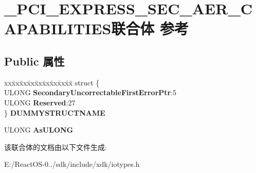 \hypertarget{union___p_c_i___e_x_p_r_e_s_s___s_e_c___a_e_r___c_a_p_a_b_i_l_i_t_i_e_s}{}\section{\+\_\+\+P\+C\+I\+\_\+\+E\+X\+P\+R\+E\+S\+S\+\_\+\+S\+E\+C\+\_\+\+A\+E\+R\+\_\+\+C\+A\+P\+A\+B\+I\+L\+I\+T\+I\+E\+S联合体 参考}
\label{union___p_c_i___e_x_p_r_e_s_s___s_e_c___a_e_r___c_a_p_a_b_i_l_i_t_i_e_s}
\subsection*{Public 属性}
\begin{DoxyCompactItemize}
\item 
\mbox{\label{union___p_c_i___e_x_p_r_e_s_s___s_e_c___a_e_r___c_a_p_a_b_i_l_i_t_i_e_s_a1315ac482057d6ddafa5f04cd9b67355}} 
\begin{tabbing}
xx\=xx\=xx\=xx\=xx\=xx\=xx\=xx\=xx\=\kill
struct \{\\
\>ULONG {\bfseries SecondaryUncorrectableFirstErrorPtr}:5\\
\>ULONG {\bfseries Reserved}:27\\
\} {\bfseries DUMMYSTRUCTNAME}\\

\end{tabbing}\item 
\mbox{\label{union___p_c_i___e_x_p_r_e_s_s___s_e_c___a_e_r___c_a_p_a_b_i_l_i_t_i_e_s_a40f6072874c4ffcc2c92a97a63f70615}} 
U\+L\+O\+NG {\bfseries As\+U\+L\+O\+NG}
\end{DoxyCompactItemize}


该联合体的文档由以下文件生成\+:\begin{DoxyCompactItemize}
\item 
E\+:/\+React\+O\+S-\/0../sdk/include/xdk/iotypes.\+h\end{DoxyCompactItemize}
